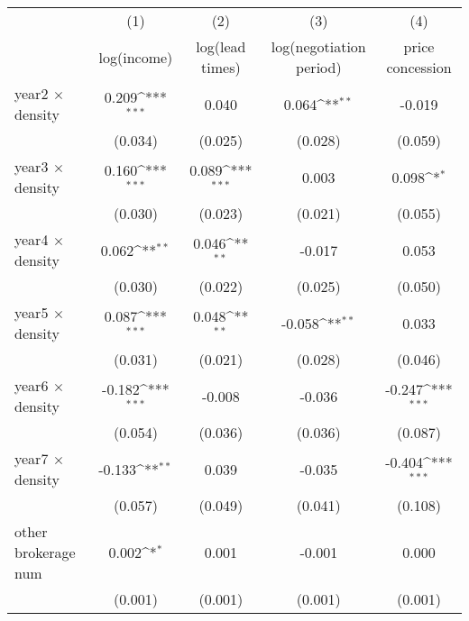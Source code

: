 {
\def\sym#1{\ifmmode^{#1}\else\(^{#1}\)\fi}
\begin{tabular}{l*{4}{c}}
\toprule
            &\multicolumn{1}{c}{(1)}&\multicolumn{1}{c}{(2)}&\multicolumn{1}{c}{(3)}&\multicolumn{1}{c}{(4)}\\
            &\multicolumn{1}{c}{log(income)}&\multicolumn{1}{c}{log(lead times)}&\multicolumn{1}{c}{log(negotiation period)}&\multicolumn{1}{c}{price concession}\\
\midrule
year2 $\times$ density&       0.209\sym{***}&       0.040         &       0.064\sym{**} &      -0.019         \\
            &     (0.034)         &     (0.025)         &     (0.028)         &     (0.059)         \\
\addlinespace
year3 $\times$ density&       0.160\sym{***}&       0.089\sym{***}&       0.003         &       0.098\sym{*}  \\
            &     (0.030)         &     (0.023)         &     (0.021)         &     (0.055)         \\
\addlinespace
year4 $\times$ density&       0.062\sym{**} &       0.046\sym{**} &      -0.017         &       0.053         \\
            &     (0.030)         &     (0.022)         &     (0.025)         &     (0.050)         \\
\addlinespace
year5 $\times$ density&       0.087\sym{***}&       0.048\sym{**} &      -0.058\sym{**} &       0.033         \\
            &     (0.031)         &     (0.021)         &     (0.028)         &     (0.046)         \\
\addlinespace
year6 $\times$ density&      -0.182\sym{***}&      -0.008         &      -0.036         &      -0.247\sym{***}\\
            &     (0.054)         &     (0.036)         &     (0.036)         &     (0.087)         \\
\addlinespace
year7 $\times$ density&      -0.133\sym{**} &       0.039         &      -0.035         &      -0.404\sym{***}\\
            &     (0.057)         &     (0.049)         &     (0.041)         &     (0.108)         \\
\addlinespace
other brokerage num  &       0.002\sym{*}  &       0.001         &      -0.001         &       0.000         \\
            &     (0.001)         &     (0.001)         &     (0.001)         &     (0.001)         \\

\end{tabular}}
